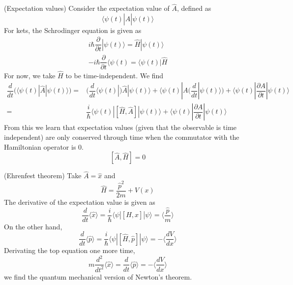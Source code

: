\begin{defi}
(Expectation values) Consider the expectation value of $\hat{A}$, defined as
\[\langle \psi (t)|\hat{A}|\psi (t)\rangle \]
For kets, the Schrodinger equation is given as
\begin{align*}
i\hbar \dfrac{\partial }{\partial t}|\psi (t)\rangle =\hat{H}|\psi (t)\rangle \\
-i\hbar \dfrac{\partial }{\partial t}\langle \psi (t)=\langle \psi (t)|\hat{H} 
\end{align*}
For now, we take $\hat{H}$ to be time-independent. We find
\begin{align*}
\dfrac{d }{d t}\Big(\langle \psi (t)|\hat{A}|\psi (t)\rangle \Big)=&\Big(\dfrac{d }{d t}\langle \psi (t)| \Big)\hat{A}|\psi (t)\rangle +\langle \psi (t)|A\Big(\dfrac{d }{d t}|\psi (t)\rangle\Big) +\langle \psi (t)|\dfrac{\partial A}{\partial t}|\psi (t)\rangle   \\
=&\dfrac{i}{\hbar }\langle \psi(t)|[\hat{H},\hat{A}]|\psi (t)\rangle +\langle \psi (t)|\dfrac{\partial A}{\partial t}|\psi (t)\rangle 
\end{align*}
From this we learn that expectation values (given that the observable is time independent) are only conserved through time when the commutator with the Hamiltonian operator is 0.
\[[\hat{A},\hat{H}]=0\]
\end{defi}
\vspace{2ex}
\begin{ex}
(Ehrenfest theorem) Take $\hat{A}=\hat{x}$ and 
\[\hat{H}=\dfrac{\hat{p}^2}{2m}+V(x)\]
The derivative of the expectation value is given as
\[\dfrac{d }{d t}\langle \hat{x}\rangle =\dfrac{i}{\hbar }\langle \psi |[H,\hat{x}]|\psi \rangle =\Big\langle \dfrac{\hat{p}}{m}\Big\rangle  \]
On the other hand,
\[\dfrac{d }{d t}\langle \hat{p}\rangle =\dfrac{i}{\hbar }\langle \psi |[\hat{H},\hat{p}]|\psi \rangle  =-\Big\langle \dfrac{d V}{d x}\Big\rangle  \]
Derivating the top equation one more time,
\[m\dfrac{d ^2}{d t^2}\langle \hat{x}\rangle =\dfrac{d }{d t}\langle \hat{p}\rangle =-\Big\langle \dfrac{d V}{d x}\Big\rangle    \]
we find the quantum mechanical version of Newton's theorem.
\end{ex}
\vspace{2ex}

